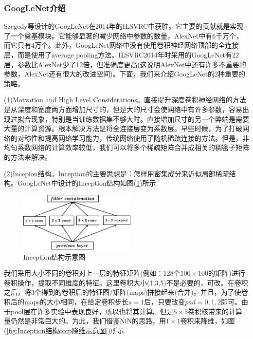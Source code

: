         \subsubsection{GoogLeNet介绍}
            \par
            Szegedy等设计的GoogLeNet\cite{2014.Christian}在2014年的ILSVRC中获胜。它主要的贡献就是实现了一个奠基模块。它能够显著的减少网络中参数的数量，AlexNet中有6千万个，而它只有4万个。此外，GoogLeNet网络中没有使用卷积神经网络顶部的全连接层，而是使用了average pooling方法。ILSVRC2014年时采用的GoogLeNet有22层，参数比AlexNet少了12倍，但准确度更高(这说明AlexNet中还有许多不重要的参数，AlexNet还有很大的改进空间)。下面，我们来介绍GoogLeNet的2种重要的策略。
            \par
            (1)Motvation and High Level Considerations。直接提升深度卷积神经网络的方法是从深度和宽度两方面增加尺寸的，但是大的尺寸会使网络中有许多参数，容易出现过拟合现象，特别是当训练数据集不够大时。直接增加尺寸的另一个弊端是需要大量的计算资源。根本解决方法是将全连接层变为系数层。早些时候，为了打破网络的对称性和提高网络学习能力，传统网络使用了随机稀疏连接的方法。但是，非均匀系数网络的计算效率较低，我们可以将多个稀疏矩阵合并成相关的稠密子矩阵的方法来解决。
            \par
            (2)Incepion结构。Inception的主要思想是：怎样用密集成分来近似局部稀疏结构。GoogLeNet\cite{2014.Christian}中设计的Inception结构如图(\ref{fig:Inception结构示意图})所示
             \begin{figure}[H]
            \centering
            \includegraphics[height=3cm]{images/Inception_structure.jpg}
            \caption{Inception结构示意图}
            \label{fig:Inception结构示意图}
            \end{figure}
            \par
            我们采用大小不同的卷积对上一层的特征矩阵(例如：128个$100\times 100$的矩阵)进行卷积操作，提取不同维度的特征。这里卷积大小(1,3,5)不是必要的，可改。在卷积之后，将3个得到的卷积后的特征图/矩阵(maps)拼接起来(合并)。并且，为了使卷积后的maps的大小相同，在给定卷积步长$s=1$后，只要改变$pad=0,1,2$即可。由于pool层在许多实验中表现良好，所以也将其计算。但是$5\times 5$卷积核带来的计算量仍然是非常巨大的。为此，我们借鉴NiN的思路，用$1\times 1$卷积来降维，如图(\ref{fig:Inception结构cccp降维示意图})所示\\
